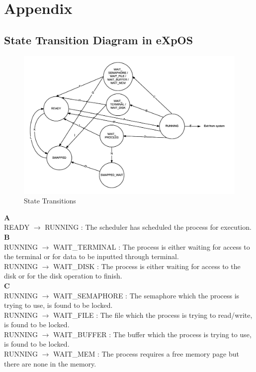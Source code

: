 \chapter{Appendix}
\label{app2}

\section{State Transition Diagram in eXpOS}

\begin{figure}[ht]
\centering
\includegraphics[scale=0.50]{figures/state.png}
\caption{\footnotesize State Transitions}
\label{fig_1}
\end{figure}

\textbf{A}\\
READY $\rightarrow$ RUNNING : The scheduler has scheduled the process for execution.\\

\textbf{B}\\
RUNNING  $\rightarrow$ WAIT\_TERMINAL : The process is either waiting for access to the terminal or for data to be inputted through terminal.\\
RUNNING  $\rightarrow$ WAIT\_DISK :  The process is either waiting for access to the disk or for the disk operation to finish.\\

\textbf{C}\\
RUNNING $\rightarrow$ WAIT\_SEMAPHORE : The semaphore which the process is trying to use, is found to be locked.\\
RUNNING $\rightarrow$ WAIT\_FILE : The file which the process is trying to read/write, is found to be locked.\\
RUNNING $\rightarrow$ WAIT\_BUFFER : The buffer which the process is trying to use, is found to be locked.\\
RUNNING $\rightarrow$ WAIT\_MEM : The process requires a free memory page but there are none in the memory.\\

